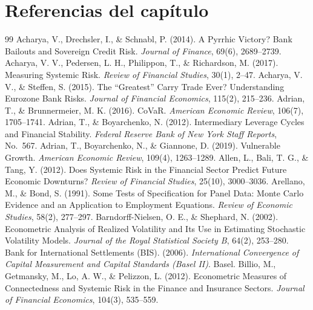 \section*{Referencias del capítulo}

\begin{thebibliography}{99}
\sloppy\small
{} Acharya, V., Drechsler, I., \& Schnabl, P. (2014). A Pyrrhic Victory? Bank Bailouts and Sovereign Credit Risk. \textit{Journal of Finance}, 69(6), 2689--2739.
 Acharya, V. V., Pedersen, L. H., Philippon, T., \& Richardson, M. (2017). Measuring Systemic Risk. \textit{Review of Financial Studies}, 30(1), 2--47.
 Acharya, V. V., \& Steffen, S. (2015). The ``Greatest'' Carry Trade Ever? Understanding Eurozone Bank Risks. \textit{Journal of Financial Economics}, 115(2), 215--236.
 Adrian, T., \& Brunnermeier, M. K. (2016). CoVaR. \textit{American Economic Review}, 106(7), 1705--1741.
 Adrian, T., \& Boyarchenko, N. (2012). Intermediary Leverage Cycles and Financial Stability. \textit{Federal Reserve Bank of New York Staff Reports}, No.\ 567.
 Adrian, T., Boyarchenko, N., \& Giannone, D. (2019). Vulnerable Growth. \textit{American Economic Review}, 109(4), 1263--1289.
 Allen, L., Bali, T. G., \& Tang, Y. (2012). Does Systemic Risk in the Financial Sector Predict Future Economic Downturns? \textit{Review of Financial Studies}, 25(10), 3000--3036.
 Arellano, M., \& Bond, S. (1991). Some Tests of Specification for Panel Data: Monte Carlo Evidence and an Application to Employment Equations. \textit{Review of Economic Studies}, 58(2), 277--297.
 Barndorff-Nielsen, O. E., \& Shephard, N. (2002). Econometric Analysis of Realized Volatility and Its Use in Estimating Stochastic Volatility Models. \textit{Journal of the Royal Statistical Society B}, 64(2), 253--280.
 Bank for International Settlements (BIS). (2006). \textit{International Convergence of Capital Measurement and Capital Standards (Basel II)}. Basel.
 Billio, M., Getmansky, M., Lo, A. W., \& Pelizzon, L. (2012). Econometric Measures of Connectedness and Systemic Risk in the Finance and Insurance Sectors. \textit{Journal of Financial Economics}, 104(3), 535--559.

\end{thebibliography}
